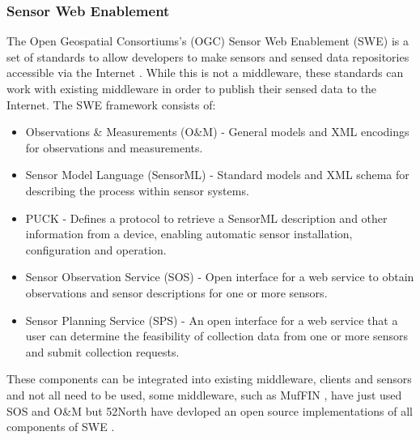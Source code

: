 	\subsubsection{Sensor Web Enablement}
		The Open Geospatial Consortiums's (OGC) Sensor Web Enablement (SWE) is a set of standards to allow developers to make sensors and sensed data repositories accessible via the Internet \cite{botts2008ogc}. While this is not a middleware, these standards can work with existing middleware in order to publish their sensed data to the Internet. The SWE framework consists of:

		\begin{itemize}
			\item Observations \& Measurements (O\&M) - General models and XML encodings for observations and measurements.
			\item Sensor Model Language (SensorML) - Standard models and XML schema for describing the process within sensor systems.
			\item PUCK - Defines a protocol to retrieve a SensorML description and other information from a device, enabling automatic sensor installation, configuration and operation.
			\item Sensor Observation Service (SOS) - Open interface for a web service to obtain observations and sensor descriptions for one or more sensors.
			\item Sensor Planning Service (SPS) - An open interface for a web service that a user can determine the feasibility of collection data from one or more sensors and submit collection requests.
		\end{itemize}

		These components can be integrated into existing middleware, clients and sensors and not all need to be used, some middleware, such as MufFIN \cite{Valente2011}, have just used SOS and O\&M but 52North have devloped an open source implementations of all components of SWE \cite{broring2011new}.

